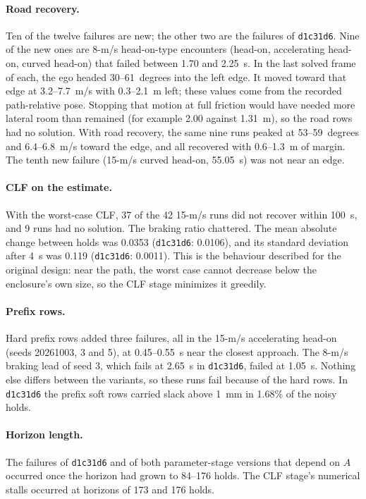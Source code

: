 \documentclass[11pt]{article}
\begin{document}
\paragraph{Road recovery.} Ten of the twelve failures are new; the other two
are the failures of \texttt{d1c31d6}. Nine of the new ones are 8-m/s
head-on-type encounters (head-on, accelerating head-on, curved head-on) that
failed between 1.70 and 2.25~s. In the last solved frame of each, the ego
headed 30--61~degrees into the left edge. It moved toward that edge at
3.2--7.7~m/s with 0.3--2.1~m left; these values come from the recorded
path-relative pose. Stopping that motion at full friction would
have needed more lateral room than remained (for example 2.00 against
1.31~m), so the road rows had no solution. With road recovery, the same nine
runs peaked at 53--59~degrees and 6.4--6.8~m/s toward the edge, and all
recovered with 0.6--1.3~m of margin. The tenth new failure (15-m/s curved
head-on, 55.05~s) was not near an edge.

\paragraph{CLF on the estimate.} With the worst-case CLF, 37 of the 42
15-m/s runs did not recover within 100~s, and 9 runs had no solution. The
braking ratio chattered. The mean absolute change between holds was 0.0353
(\texttt{d1c31d6}: 0.0106), and its standard deviation after 4~s was 0.119
(\texttt{d1c31d6}: 0.0011). This is the behaviour described for the original
design: near the path, the worst case cannot decrease below the enclosure's
own size, so the CLF stage minimizes it greedily.

\paragraph{Prefix rows.} Hard prefix rows added three failures, all in the
15-m/s accelerating head-on (seeds 20261003, 3 and 5), at 0.45--0.55~s near
the closest approach. The 8-m/s braking lead of seed 3, which fails at
2.65~s in \texttt{d1c31d6}, failed at 1.05~s. Nothing else differs between
the variants, so these runs fail because of the hard rows. In
\texttt{d1c31d6} the prefix soft rows carried slack above 1~mm in 1.68\% of
the noisy holds.

\paragraph{Horizon length.} The failures of \texttt{d1c31d6} and of both
parameter-stage versions that depend on $A$ occurred once the horizon had
grown to 84--176 holds. The CLF stage's numerical stalls occurred at
horizons of 173 and 176 holds.
\end{document}
